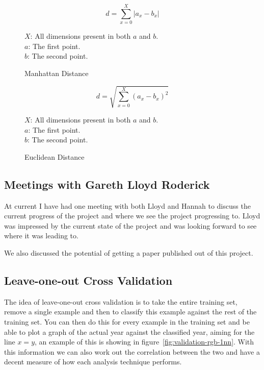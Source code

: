 \documentclass[11pt,fleqn,twoside]{article}
\begin{document}
\begin{figure}[h]
\[
d = \sum^X_{x=0}{|a_x - b_x|}
\]

\(X\): All dimensions present in both \(a\) and \(b\).\\
\(a\): The first point.\\
\(b\): The second point.

\caption{Manhattan Distance}
\label{eq:manhattan}
\end{figure}

\begin{figure}[h]
\[
d = \sqrt{\sum^X_{x=0}{(a_x - b_x)^2}}
\]

\(X\): All dimensions present in both \(a\) and \(b\).\\
\(a\): The first point.\\
\(b\): The second point.
\caption{Euclidean Distance}
\label{eq:euclidean}
\end{figure}


\subsection{Meetings with Gareth Lloyd Roderick}
At current I have had one meeting with both Lloyd and Hannah to discuss the current progress of 
the project and where we see the project progressing to. Lloyd was impressed by the current state
of the project and was looking forward to see where it was leading to.

We also discussed the potential of getting a paper published out of this project.

\subsection{Leave-one-out Cross Validation}
The idea of leave-one-out cross validation is to take the entire training set, remove a single 
example and then to classify this example against the rest of the training set. You can then do
this for every example in the training set and be able to plot a graph of the actual year against
the classified year, aiming for the line $x=y$, an example of this is showing in 
figure~\ref{fig:validation-rgb-1nn}. With this information we can also work out the correlation 
between the two and have a decent measure of how each analysis technique performs.
\end{document}
